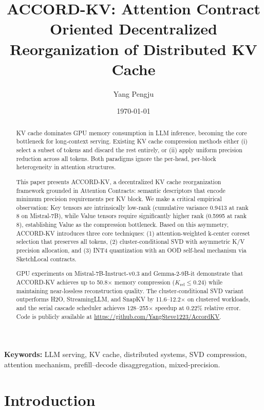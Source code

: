 \documentclass[11pt, a4paper, oneside]{article}
\title{ACCORD-KV: Attention Contract Oriented Decentralized Reorganization of Distributed KV Cache}
\author{
    Yang Pengju
}
\date{\vspace{-3ex}\centering\today}
\theoremstyle{myplain}
\theoremstyle{mydefinition}
\theoremstyle{myremark}
\begin{document}
\maketitle

\begin{abstract}
KV cache dominates GPU memory consumption in LLM inference, becoming the core bottleneck for long-context serving. Existing KV cache compression methods either (i) select a subset of tokens and discard the rest entirely, or (ii) apply uniform precision reduction across all tokens. Both paradigms ignore the per-head, per-block heterogeneity in attention structures.

This paper presents ACCORD-KV, a decentralized KV cache reorganization framework grounded in Attention Contracts: semantic descriptors that encode minimum precision requirements per KV block. We make a critical empirical observation: Key tensors are intrinsically low-rank (cumulative variance 0.9413 at rank 8 on Mistral-7B), while Value tensors require significantly higher rank (0.5995 at rank 8), establishing Value as the compression bottleneck. Based on this asymmetry, ACCORD-KV introduces three core techniques: (1) attention-weighted k-center coreset selection that preserves all tokens, (2) cluster-conditional SVD with asymmetric K/V precision allocation, and (3) INT4 quantization with an OOD self-heal mechanism via SketchLocal contracts.

GPU experiments on Mistral-7B-Instruct-v0.3 and Gemma-2-9B-it demonstrate that ACCORD-KV achieves up to 50.8$\times$ memory compression ($K_{\mathrm{rel}} \le 0.24$) while maintaining near-lossless reconstruction quality. The cluster-conditional SVD variant outperforms H2O, StreamingLLM, and SnapKV by 11.6--12.2$\times$ on clustered workloads, and the serial cascade scheduler achieves 128--255$\times$ speedup at 0.22\% relative error. Code is publicly available at \url{https://github.com/YangSteve1223/AccordKV}.
\end{abstract}

\vspace{1ex}
\textbf{Keywords:} LLM serving, KV cache, distributed systems, SVD compression, attention mechanism, pre\-fill--decode disaggregation, mixed-precision.

\newpage

\section{Introduction}
\end{document}
